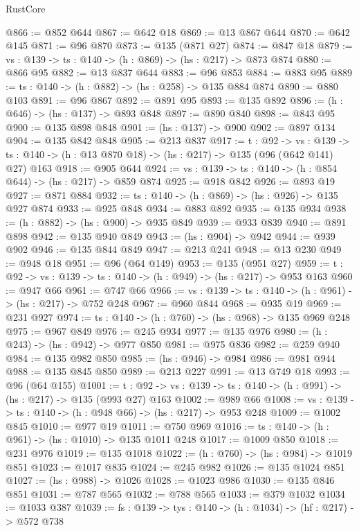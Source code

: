 \begin{lexlean}{RustCore}
\begin{coremodule}
@866 := @852 @644
@867 := @642 @18
@869 := @13 @867 @644
@870 := @642 @145
@871 := @96 @870
@873 := @135 (@871 @27)
@874 := @847 @18
@879 := {vs : @139} -> {ts : @140} -> (h : @869) -> (hs : @217) -> @873 @874
@880 := @866 @95
@882 := @13 @837 @644
@883 := @96 @853
@884 := @883 @95
@889 := {ts : @140} -> (h : @882) -> (hs : @258) -> @135 @884 @874
@890 := @880 @103
@891 := @96 @867
@892 := @891 @95
@893 := @135 @892
@896 := (h : @646) -> (hs : @137) -> @893 @848
@897 := @890 @840
@898 := @843 @95
@900 := @135 @898 @848
@901 := (hs : @137) -> @900
@902 := @897 @134
@904 := @135 @842 @848
@905 := @213 @837
@917 := {t : @92} ->
  {vs : @139} -> {ts : @140} -> (h : @13 @870 @18) -> (hs : @217) -> @135 (@96 (@642 @141) @27) @163
@918 := @905 @644
@924 := {vs : @139} -> {ts : @140} -> (h : @854 @644) -> (hs : @217) -> @859 @874
@925 := @918 @842
@926 := @893 @19
@927 := @871 @884
@932 := {ts : @140} -> (h : @869) -> (hs : @926) -> @135 @927 @874
@933 := @925 @848
@934 := @883 @892
@935 := @135 @934
@938 := (h : @882) -> (hs : @900) -> @935 @849
@939 := @933 @839
@940 := @891 @898
@942 := @135 @940 @849
@943 := (hs : @904) -> @942
@944 := @939 @902
@946 := @135 @844 @849
@947 := @213 @241
@948 := @13 @230
@949 := @948 @18
@951 := @96 (@64 @149)
@953 := @135 (@951 @27)
@959 := {t : @92} -> {vs : @139} -> {ts : @140} -> (h : @949) -> (hs : @217) -> @953 @163
@960 := @947 @66
@961 := @747 @66
@966 := {vs : @139} -> {ts : @140} -> (h : @961) -> (hs : @217) -> @752 @248
@967 := @960 @844
@968 := @935 @19
@969 := @231 @927
@974 := {ts : @140} -> (h : @760) -> (hs : @968) -> @135 @969 @248
@975 := @967 @849
@976 := @245 @934
@977 := @135 @976
@980 := (h : @243) -> (hs : @942) -> @977 @850
@981 := @975 @836
@982 := @259 @940
@984 := @135 @982 @850
@985 := (hs : @946) -> @984
@986 := @981 @944
@988 := @135 @845 @850
@989 := @213 @227
@991 := @13 @749 @18
@993 := @96 (@64 @155)
@1001 := {t : @92} ->
  {vs : @139} -> {ts : @140} -> (h : @991) -> (hs : @217) -> @135 (@993 @27) @163
@1002 := @989 @66
@1008 := {vs : @139} -> {ts : @140} -> (h : @948 @66) -> (hs : @217) -> @953 @248
@1009 := @1002 @845
@1010 := @977 @19
@1011 := @750 @969
@1016 := {ts : @140} -> (h : @961) -> (hs : @1010) -> @135 @1011 @248
@1017 := @1009 @850
@1018 := @231 @976
@1019 := @135 @1018
@1022 := (h : @760) -> (hs : @984) -> @1019 @851
@1023 := @1017 @835
@1024 := @245 @982
@1026 := @135 @1024 @851
@1027 := (hs : @988) -> @1026
@1028 := @1023 @986
@1030 := @135 @846 @851
@1031 := @787 @565
@1032 := @788 @565
@1033 := @379 @1032
@1034 := @1033 @387
@1039 := {fs : @139} -> {tys : @140} -> (h : @1034) -> (hf : @217) -> @572 @738

\end{coremodule}
\end{lexlean}
